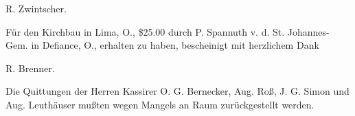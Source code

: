 \begin{unterschrift}
R. Zwintscher.
\end{unterschrift}

\trenner

Für den Kirchbau in Lima, O., \$25.00 durch P. Spannuth v. d. St. Johannes-Gem. in Defiance, O., erhalten zu haben, bescheinigt mit herzlichem Dank

\begin{unterschrift}
R. Brenner.
\end{unterschrift}

\trenner

Die Quittungen der Herren Kassirer O. G. Bernecker, Aug. Roß, J. G. Simon und Aug. Leuthäuser mußten wegen Mangels an Raum zurückgestellt werden.
